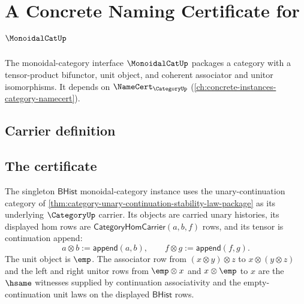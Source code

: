 \chapter{A Concrete Naming Certificate for $\MonoidalCatUp$}
\label{ch:concrete-instances-monoidalcat-namecert}

The monoidal-category interface $\MonoidalCatUp$ packages a category with a tensor-product bifunctor, unit object, and coherent associator and unitor isomorphisms. It depends on $\NameCert_{\CategoryUp}$ (\autoref{ch:concrete-instances-category-namecert}).

\section{Carrier definition}
\label{sec:monoidalcat-carrier}

\section{The certificate}
\label{sec:monoidalcat-certificate}

\begin{definition}
\label{def:monoidalcat-singleton-tensor-instance}
The singleton $\mathsf{BHist}$ monoidal-category instance uses the unary-continuation category of \autoref{thm:category-unary-continuation-stability-law-package} as its underlying $\CategoryUp$ carrier. Its objects are carried unary histories, its displayed hom rows are $\mathsf{CategoryHomCarrier}(a,b,f)$ rows, and its tensor is continuation append:
$$
a\otimes b := \mathsf{append}(a,b),\qquad
f\otimes g := \mathsf{append}(f,g).
$$
The unit object is $\emp$. The associator row from $(x\otimes y)\otimes z$ to $x\otimes(y\otimes z)$ and the left and right unitor rows from $\emp\otimes x$ and $x\otimes\emp$ to $x$ are the $\hsame$ witnesses supplied by continuation associativity and the empty-continuation unit laws on the displayed $\mathsf{BHist}$ rows.
\end{definition}

